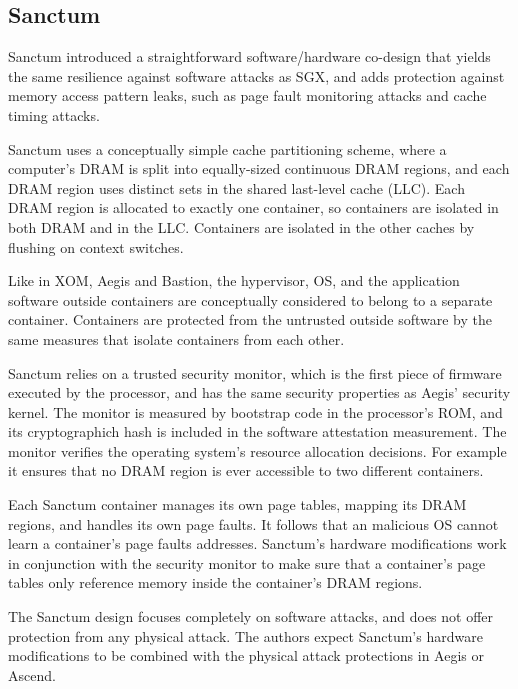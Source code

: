 \subsection{Sanctum}

Sanctum \cite{costan2015sanctum} introduced a straightforward software/hardware
co-design that yields the same resilience against software attacks as SGX, and
adds protection against memory access pattern leaks, such as page fault
monitoring attacks and cache timing attacks.

Sanctum uses a conceptually simple cache partitioning scheme, where a
computer's DRAM is split into equally-sized continuous DRAM regions, and each
DRAM region uses distinct sets in the shared last-level cache (LLC). Each DRAM
region is allocated to exactly one container, so containers are isolated in
both DRAM and in the LLC. Containers are isolated in the other caches by
flushing on context switches.

Like in XOM, Aegis and Bastion, the hypervisor, OS, and the application
software outside containers are conceptually considered to belong to a separate
container. Containers are protected from the untrusted outside software by the
same measures that isolate containers from each other.

Sanctum relies on a trusted security monitor, which is the first piece of
firmware executed by the processor, and has the same security properties as
Aegis' security kernel. The monitor is measured by bootstrap code in the
processor's ROM, and its cryptographich hash is included in the software
attestation measurement. The monitor verifies the operating system's resource
allocation decisions. For example it ensures that no DRAM region is ever
accessible to two different containers.

Each Sanctum container manages its own page tables, mapping its DRAM regions,
and handles its own page faults. It follows that an malicious OS cannot learn
a container's page faults addresses. Sanctum's hardware modifications work in
conjunction with the security monitor to make sure that a container's page
tables only reference memory inside the container's DRAM regions.

The Sanctum design focuses completely on software attacks, and does not offer
protection from any physical attack. The authors expect Sanctum's hardware
modifications to be combined with the physical attack protections in Aegis or
Ascend.
